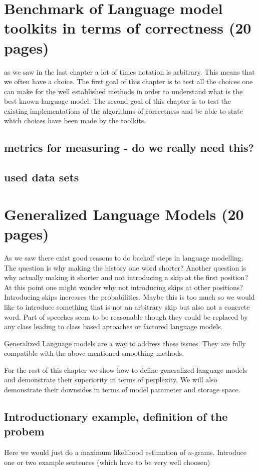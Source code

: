 \documentclass[•]{book}
\begin{document}
\chapter{Benchmark of Language model toolkits in terms of correctness (20 pages)}
as we saw in the last chapter a lot of times notation is arbitrary.
This means that we often have a choice. 
The first goal of this chapter is to test all the choices one can make for the well established methods in order to understand what is the best known language model. 
The second goal of this chapter is to test the existing implementations of the algorithms of correctness and be able to state which choices have been made by the toolkits.
\section{metrics for measuring - do we really need this?}
\section{used data sets}


\chapter{Generalized Language Models (20 pages)}
As we saw there exist good reasons to do backoff steps in language modelling. 
The question is why making the history one word shorter?
Another question is why actually making it shorter and not introducing a skip at the first position?
At this point one might wonder why not introducing skips at other positions? 
Introducing skips increases the probabilities. 
Maybe this is too much so we would like to introduce something that is not an arbitrary skip but also not a concrete word. Part of speeches seem to be reasonable though they could be replaced by any class leading to class based aproaches\cite{CLASS:BASED:LMS} or factored language models\cite{FACTORED:LANGUAGE:MODEL}.

Generalized Language models are a way to address these issues. 
They are fully compatible with the above mentioned smoothing methods. 

For the rest of this chapter we show how to define generalized language models and demonstrate their superiority in terms of perplexity. 
We will also demonstrate their downsides in terms of model parameter and storage space.


\section{Introductionary example, definition of the probem}
Here we would just do a maximum likelihood estimation of $n$-grams. 
Introduce one or two example sentences (which have to be very well choosen)
\end{document}
